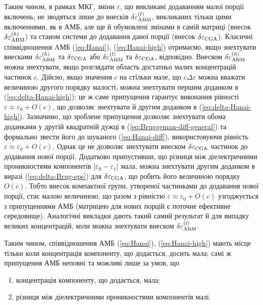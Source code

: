 \documentclass[14pt,twoside]{vakthesis}
\begin{document}
Таким чином, в рамках МКГ, зміни $\varepsilon$, що викликані
додаванням малої порції включень, не зводяться лише до внесків $\delta\varepsilon_{\rm ABM}^{(l)}$,
викликаних тільки цими включеннями, як в АМБ, але ще й обумовлені змінами в самій матриці
(внесок $\delta\varepsilon_{\rm ABM}^{(h)}$) та станом системи до додавання даної порції (внесок $\delta\varepsilon_{\rm CGA}$).
Класичні співвідношення AМБ (\ref{eq:Hanai}), (\ref{eq:Hanai-high}) отримаємо, якщо знехтувати внесками $\delta\varepsilon_{\rm ABM}^{(h)}$ та $\delta\varepsilon_{\rm CGA}$ або $\delta\varepsilon_{\rm ABM}^{(l)}$ та $\delta\varepsilon_{\rm CGA}$, відповідно. 
Внеском $\delta\varepsilon_{\rm ABM}^{(h)}$ можна знехтувати, якщо розглядати область достатньо малих концентрацій частинок $c$. Дійсно, якщо значення $c$ на стільки мале, що $c\Delta\varepsilon$ можна вважати величиною другого порядку малості, можна знехтувати першим доданком в (\ref{eq:delta-Hanai-high}); це ж саме припущення гарантує виконання рівності $\varepsilon \approx \varepsilon_0 + O(c)$, що дозволяє знехтувати й другим доданком в (\ref{eq:delta-Hanai-high}).  Зазначимо, що зроблене припущення дозволяє знехтувати обома доданками у другій квадратній дужці в (\ref{eq:Bruggeman-diff-general}) та формально звести його до шуканого (\ref{eq:Hanai-diff}), використовуючи рівність $\varepsilon \approx \varepsilon_0 + O(c)$. Однак це не дозволяє знехтувати внеском $\delta\varepsilon_{\rm CGA}$ частинок до додавання нової порції. Додатково припустивши, що різниця між діелектричними проникностями компонентів $|\varepsilon_0 - \varepsilon_1|$ мала, можна знехтувати другим доданком в виразі (\ref{eq:delta-Brug-eps}) для $\delta\varepsilon_{\rm CGA}$, що робить його величиною порядку $O(c)$. Тобто внесок компактної групи, утвореної частинками до додавання нової порції, стає малою величиною, що разом з рівністю $\varepsilon \approx \varepsilon_0 + O(c)$ узгоджується з припущеннями АМБ (матрицею для нових порцій є поточне ефективне середовище). 
Аналогічні викладки дають такий самий результат й для випадку великих концентрацій, коли можна знехтувати внеском $\delta\varepsilon_{\rm ABM}^{(l)}$. 

Таким чином, співвідношення АМБ (\ref{eq:Hanai}), (\ref{eq:Hanai-high}) мають місце тільки коли концентрація компоненту, що додається, досить мала; самі ж припущення АМБ неповні та можливі лише за умов, що
\begin{enumerate}[label=\arabic*)]
	\item концентрація компоненту, що додається, мала;
	\item різниця між діелектричними проникностями компонентів малі.
\end{enumerate}
\end{document}
